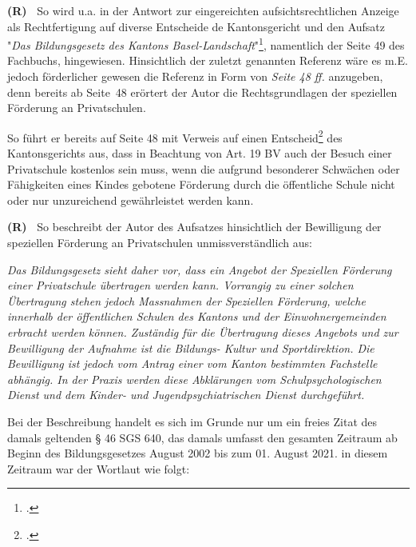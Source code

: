 \documentclass[paper=a4,fontsize=12pt, oneside, numbers=noenddot]{scrbook}
\newcounter{rz}
\newcommand{\Rz}{
	\addtocounter{rz}{1}\textbf{(R\arabic{rz})~}
}
\begin{document}
\Rz So wird u.a. in der Antwort zur eingereichten aufsichtsrechtlichen Anzeige als Rechtfertigung auf diverse Entscheide de Kantonsgericht und den Aufsatz "\textit{Das Bildungsgesetz des Kantons Basel-Landschaft}"\footcite[Seite 34 ff.]{2007:Biaggini:StaatsVerwaltungsrechBL}, namentlich der Seite 49 des Fachbuchs, hingewiesen. Hinsichtlich der zuletzt genannten Referenz wäre es m.E. jedoch förderlicher gewesen die Referenz in Form von \textit{Seite 48 ff.}  anzugeben, denn bereits ab Seite~48 erörtert der Autor die Rechtsgrundlagen der speziellen Förderung an Privatschulen. 

So führt er bereits auf Seite 48 mit Verweis auf einen Entscheid\footcite{KGE8100498} des Kantonsgerichts aus, dass in Beachtung von Art. 19 BV auch der Besuch einer Privatschule kostenlos sein muss, wenn die aufgrund besonderer Schwächen oder Fähigkeiten eines Kindes gebotene Förderung durch die öffentliche Schule nicht oder nur unzureichend gewährleistet werden kann.

\Rz So beschreibt der Autor des Aufsatzes hinsichtlich der Bewilligung der speziellen Förderung an Privatschulen unmissverständlich aus: 
\begin{addmargin}[2.5em]{0em}\emph{Das Bildungsgesetz sieht daher vor, dass ein Angebot der Speziellen Förderung einer Privatschule übertragen werden kann. Vorrangig zu einer solchen Übertragung stehen jedoch Massnahmen der Speziellen Förderung, welche innerhalb der öffentlichen Schulen des Kantons und der Einwohnergemeinden erbracht werden können. Zuständig für die Übertragung dieses Angebots und zur Bewilligung der Aufnahme ist die Bildungs- Kultur und Sportdirektion. Die Bewilligung ist jedoch vom Antrag einer vom Kanton bestimmten Fachstelle abhängig. In der Praxis werden diese Abklärungen vom Schulpsychologischen Dienst und dem Kinder- und Jugendpsychiatrischen Dienst durchgeführt.
}\end{addmargin}

Bei der Beschreibung handelt es sich im Grunde nur um ein freies Zitat des damals geltenden § 46 SGS 640, das damals umfasst den gesamten Zeitraum ab Beginn des Bildungsgesetzes August 2002 bis zum 01. August 2021. in diesem Zeitraum war der Wortlaut wie folgt:
\end{document}
